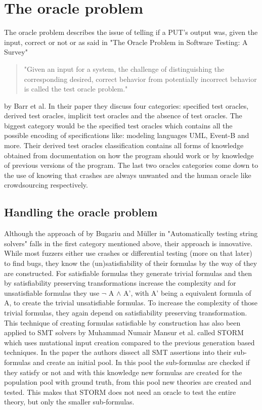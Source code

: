 \section{The oracle problem}
\label{cha:2:OracleProblem}
The oracle problem describes the issue of telling if a PUT's output was, given the input, correct or not or as said in "The Oracle Problem in Software Testing: A Survey" \cite{10barr2014oracleProblem} 
\begin{quote}
	"Given an input for a system, the challenge of distinguishing the corresponding desired, correct behavior from potentially incorrect behavior is called the test oracle problem."
\end{quote} by Barr et al.
In their paper they discuss four categories: specified test oracles, derived test oracles, implicit test oracles and the absence of test oracles. The biggest category would be the specified test oracles which contains all the possible encoding of specifications like: modeling languages UML, Event-B and more. Their derived test oracles classification contains all forms of knowledge obtained from documentation on how the program should work or by knowledge of previous versions of the program. The last two oracles categories come down to the use of knowing that crashes are always unwanted and the human oracle like crowdsourcing respectively.

\subsection{Handling the oracle problem}
\label{cha:2:handelingOracelproblem}
Although the approach of by Bugariu and M\"uller in "Automatically testing string solvers" \cite{9bugariu2020automaticallyTestingStringSolvers} falls in the first category mentioned above, their approach is innovative. While most fuzzers either use crashes or differential testing (more on that later) to find bugs, they know the (un)satisfiability of their formulas by the way of they are constructed. For satisfiable formulas they generate trivial formulas and then by satisfiability preserving transformations increase the complexity and for unsatisfiable formulas they use $\neg$ A $\land$ A', with A' being a equivalent formula of A, to create the trivial unsatisfiable formulas. To increase the complexity of those trivial formulas, they again depend on satisfiability preserving transformation. This technique of creating formulas satisfiable by construction has also been applied to SMT solvers by Muhammad Numair Mansur et al. called STORM \cite{1mansur2020detecting} which uses mutational input creation compared to the previous generation based techniques. In the paper the authors dissect all SMT assertions into their sub-formulas and create an initial pool. In this pool the sub-formulas are checked if they satisfy or not and with this knowledge new formulas are created for the population pool with ground truth, from this pool new theories are created and tested. This makes that STORM does not need an oracle to test the entire theory, but only the smaller sub-formulas.


